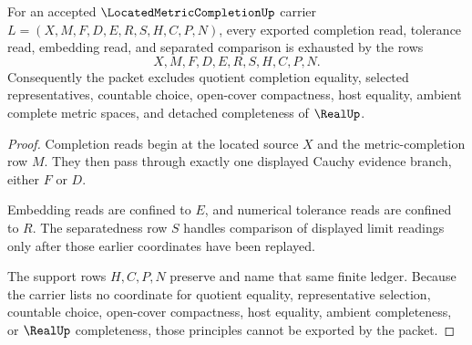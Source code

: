 \begin{theorem}
\label{thm:located-metric-completion-nonescape}
For an accepted $\LocatedMetricCompletionUp$ carrier $L=(X,M,F,D,E,R,S,H,C,P,N)$, every exported completion read, tolerance read, embedding read, and separated comparison is exhausted by the rows
$$
X,M,F,D,E,R,S,H,C,P,N .
$$
Consequently the packet excludes quotient completion equality, selected representatives, countable choice, open-cover compactness, host equality, ambient complete metric spaces, and detached completeness of $\RealUp$.
\end{theorem}
\begin{proof}
Completion reads begin at the located source $X$ and the metric-completion row $M$. They then pass through exactly one displayed Cauchy evidence branch, either $F$ or $D$.

Embedding reads are confined to $E$, and numerical tolerance reads are confined to $R$. The separatedness row $S$ handles comparison of displayed limit readings only after those earlier coordinates have been replayed.

The support rows $H,C,P,N$ preserve and name that same finite ledger. Because the carrier lists no coordinate for quotient equality, representative selection, countable choice, open-cover compactness, host equality, ambient completeness, or $\RealUp$ completeness, those principles cannot be exported by the packet.
\end{proof}

